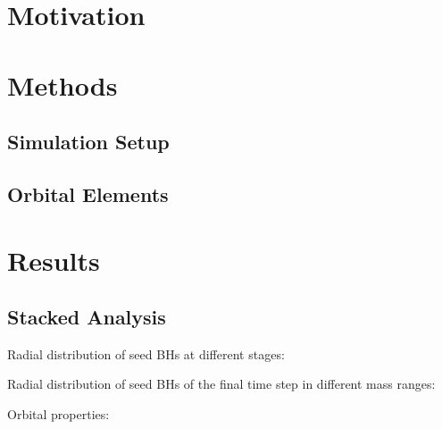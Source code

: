 \documentclass[useAMS,usenatbib]{mn2e}
\begin{document}
\section{Motivation}

\section{Methods}
 
\subsection{Simulation Setup}

\subsection{Orbital Elements}

\section{Results}

\subsection{Stacked Analysis}
Radial distribution of seed BHs at different stages:
\begin{figure}
\end{figure}
\begin{figure}
\end{figure}
\begin{figure}
\end{figure}
Radial distribution of seed BHs of the final time step in different mass ranges:
\begin{figure}
\end{figure}

\begin{figure}
\end{figure}

\begin{figure}
\end{figure}

Orbital properties:
\begin{figure}
\end{figure}
\end{document}
